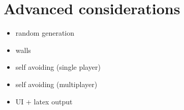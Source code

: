 \documentclass[10pt]{beamer}
\begin{document}
\section{Advanced considerations}
\begin{frame}[fragile]
  \begin{itemize}
    \item random generation
    \item walls
    \item self avoiding (single player)
    \item self avoiding (multiplayer)
    \item UI + latex output
  \end{itemize}
\end{frame}

% 
% 
\end{document}
